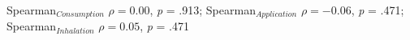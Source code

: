 Spearman$_{Consumption}$ $\rho = 0.00$, \textit{p} = .913; Spearman$_{Application}$ $\rho = -0.06$, \textit{p} = .471; Spearman$_{Inhalation}$ $\rho = 0.05$, \textit{p} = .471%
